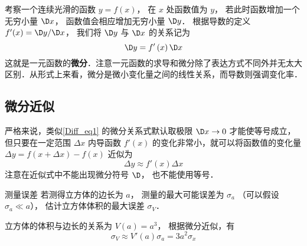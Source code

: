 
考察一个连续光滑的函数 $y = f\left( x \right)$， 在 ${x}$ 处函数值为 ${y}$， 若此时函数增加一个无穷小量 $\D x$， 函数值会相应增加无穷小量 $\D y$． 根据导数的定义 $f'({{x}}) = \D y/\D x$， 我们将 $\D y$ 与 $\D x$ 的关系记为
\begin{equation}\label{Diff_eq1}
\D y = f'\left( {{x}} \right)\D x
\end{equation}
这就是一元函数的\textbf{微分}．注意一元函数的求导和微分除了表达方式不同外并无太大区别．从形式上来看，微分是微小变化量之间的线性关系，而导数则强调变化率．

\subsection{微分近似}
严格来说，类似\autoref{Diff_eq1} 的微分关系式默认取极限 $\D x \to 0$ 才能使等号成立，但只要在一定范围 $\Delta x$ 内导函数 $f'(x)$ 的变化非常小，就可以将函数值的变化量 $\Delta y = f(x+\Delta x)-f(x)$ 近似为
\begin{equation}
\Delta y \approx f'(x) \Delta x
\end{equation}
注意在近似式中不能出现微分符号 $\D$， 也不能使用等号．

\begin{exam}{测量误差}\label{Diff_ex1}
若测得立方体的边长为 $a$， 测量的最大可能误差为 $\sigma_a$ （可以假设 $\sigma_a \ll a$）， 估计立方体体积的最大误差 $\sigma_V$．

立方体的体积与边长的关系为 $V(a)=a^3$， 根据微分近似，有
\begin{equation}
\sigma_V \approx V'(a) \sigma_a = 3a^2 \sigma_x
\end{equation}
\end{exam}




